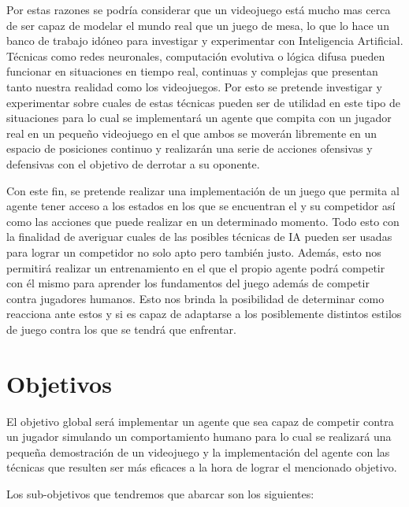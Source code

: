 \bigskip

Por estas razones se podría considerar que un videojuego está mucho mas cerca de ser capaz de modelar el mundo real que un juego de mesa, lo que lo hace un banco de trabajo idóneo para investigar y experimentar con Inteligencia Artificial. Técnicas como redes neuronales, computación evolutiva o lógica difusa pueden funcionar en situaciones en tiempo real, continuas y complejas que presentan tanto nuestra realidad como los videojuegos. Por esto se pretende investigar y experimentar sobre cuales de estas técnicas pueden ser de utilidad en este tipo de situaciones para lo cual se implementará un agente que compita con un jugador real en un pequeño videojuego en el que ambos se moverán libremente en un espacio de posiciones continuo y realizarán una serie de acciones ofensivas y defensivas con el objetivo de derrotar a su oponente.

\bigskip

Con este fin, se pretende realizar una implementación de un juego que permita al agente tener acceso a los estados en los que se encuentran el y su competidor así como las acciones que puede realizar en un determinado momento. Todo esto con la finalidad de averiguar cuales de las posibles técnicas de IA pueden ser usadas para lograr un competidor no solo apto pero también justo. Además, esto nos permitirá realizar un entrenamiento en el que el propio agente podrá competir con él mismo para aprender los fundamentos del juego además de competir contra jugadores humanos. Esto nos brinda la posibilidad de determinar como reacciona ante estos y si es capaz de adaptarse a los posiblemente distintos estilos de juego contra los que se tendrá que enfrentar.

\section{Objetivos}

El objetivo global será implementar un agente que sea capaz de competir contra un jugador simulando un comportamiento humano para lo cual se realizará una pequeña demostración de un videojuego y la implementación del agente con las técnicas que resulten ser más eficaces a la hora de lograr el mencionado objetivo.

\bigskip

Los sub-objetivos que tendremos que abarcar son los siguientes:

